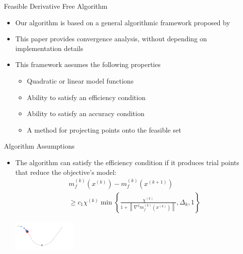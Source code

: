 \documentclass{beamer}
\newcommand{\xk}{{{x}^{(k)}}}
\begin{document}
\begin{frame}{Feasible Derivative Free Algorithm}
	\begin{itemize}
		\item Our algorithm is based on a general algorithmic framework proposed by \cite{CONEJO2013324}
		\item This paper provides convergence analysis, without depending on implementation details
		\item This framework assumes the following properties
			\begin{itemize}
				\item Quadratic or linear model functions
				\item Ability to satisfy an efficiency condition
				\item Ability to satisfy an accuracy condition
				\item A method for projecting points onto the feasible set
			\end{itemize}
	\end{itemize}
\end{frame}




\begin{frame}{Algorithm Assumptions}
	\begin{itemize}
		\item The algorithm can satisfy the efficiency condition if it produces trial points that reduce the objective's model:
		\begin{align*}
			& m_f^{(k)}\left(\xk\right) - m_f^{(k)}\left(x^{(k+1)}\right) \\
			& \ge c_1 \chi^{(k)} \min \left\{
				\frac{\chi^{(k)}}{1 + \left\|\nabla^2 m_f^{(k)}\left(x^{(k)}\right)\right\|},
				\Delta_k, 1\right\}
		\end{align*}

		\begin{center}
			\includegraphics[width=120px]{images/sufficient_reduction.png}
		\end{center}
	\end{itemize}
\end{frame}
\end{document}
